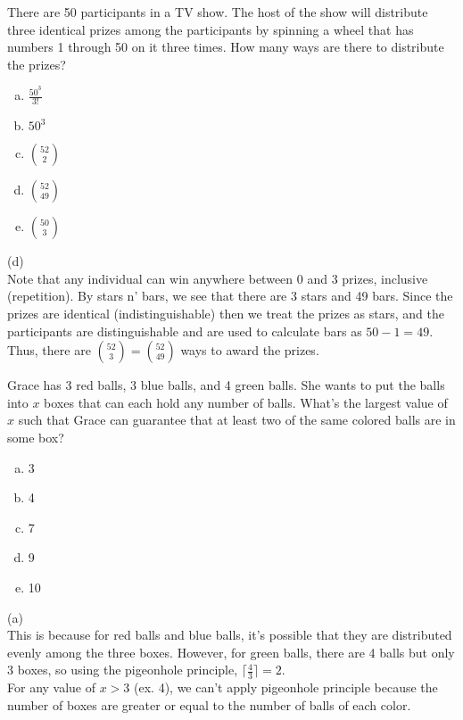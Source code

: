 There are 50 participants in a TV show. The host of the show will distribute three identical prizes among the participants by spinning a wheel that has numbers 1 through 50 on it three times. How many ways are there to distribute the prizes?

\begin{enumerate}[(a)]
	\item  $\frac{50^3}{3!}$
    
	\item  $50^3$
    
	\item  $\binom{52}{2}$
    
	\item  $\binom{52}{49}$
    
	\item  $\binom{50}{3}$

\end{enumerate}
\begin{solution}

(d) \\
Note that any individual can win anywhere between 0 and 3 prizes, inclusive (repetition). By stars n' bars, we see that there are 3 stars and 49 bars. Since the prizes are identical (indistinguishable) then we treat the prizes as stars, and the participants are distinguishable and are used to calculate bars as $50 - 1 = 49$. Thus, there are $\binom{52}{3} = \binom{52}{49}$ ways to award the prizes.

\end{solution}


Grace has 3 red balls, 3 blue balls, and 4 green balls. She wants to put the balls into $x$ boxes that can each hold any number of balls. What's the largest value of $x$ such that Grace can guarantee that at least two of the same colored balls are in some box? 

\begin{enumerate}[a)]
\item 3
\item 4
\item 7
\item 9
\item 10
\end{enumerate}

\begin{solution}
(a) \\
This is because for red balls and blue balls, it's possible that they are distributed evenly among the three boxes. However, for green balls, there are 4 balls but only 3 boxes, so using the pigeonhole principle, $\lceil \frac{4}{3} \rceil = 2$. \\
For any value of $ x > 3$ (ex. 4), we can't apply pigeonhole principle because the number of boxes are greater or equal to the number of balls of each color.
\end{solution}


